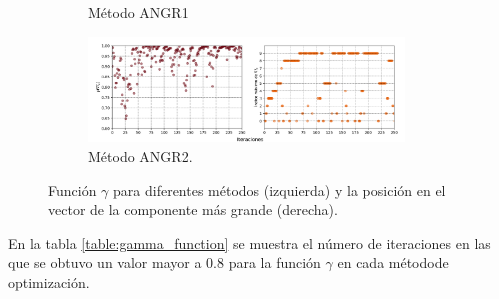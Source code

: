 \begin{figure}[H]
\begin{subfigure}{8.4cm}
        \caption{Método ANGR1}
    \end{subfigure}
    \begin{subfigure}{16.5cm}
        \centering
        \includegraphics[width=8.4cm]{graphics/gamma/ANGR1.png}
        \caption{Método ANGR2.}
    \end{subfigure}
    \caption{Función $\gamma$ para diferentes métodos (izquierda) y la posición en el vector de la componente más grande (derecha).}
    \label{fig:gamma}
\end{figure}

En la tabla \ref{table:gamma_function} se muestra el número de iteraciones en las que se obtuvo un valor mayor a 0.8 para la función $\gamma$ en cada métodode optimización.

